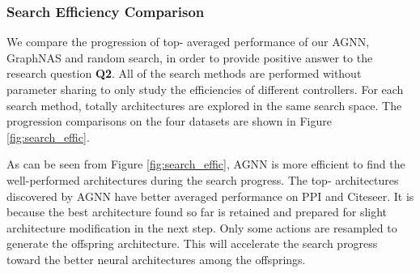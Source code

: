 \documentclass[sigconf]{acmart}
\begin{document}
\begin{figure*}[t]
\centering
\hspace{-.3cm}
\vspace{-.2cm}
\caption{Progression of top- averaged performance of different search methods, i.e., AGNN, GraphNAS, and random search.}
\label{fig:search_effic}
\end{figure*}

\subsubsection{\textbf{Search Efficiency Comparison}}
We compare the progression of top- averaged performance of our AGNN, GraphNAS and random search, in order to provide positive answer to the research question \textbf{Q2}. All of the search methods are performed without parameter sharing to only study the efficiencies of different controllers. For each search method, totally  architectures are explored in the same search space. The progression comparisons on the four datasets are shown in Figure \ref{fig:search_effic}. 

As can be seen from Figure \ref{fig:search_effic}, AGNN is more efficient to find the well-performed architectures during the search progress. The top- architectures discovered by AGNN have better averaged performance on PPI and Citeseer. It is because the best architecture found so far is retained and prepared for slight architecture modification in the next step. Only some actions are resampled to generate the offspring architecture. This will accelerate the search progress toward the better neural architectures among the offsprings. 
\end{document}
